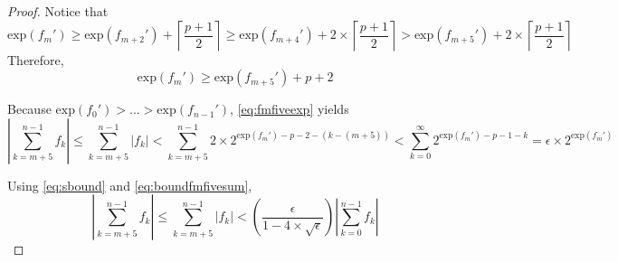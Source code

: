 \documentclass[12pt]{article}
\providecommand{\ceil}[1]{\left \lceil #1 \right \rceil }
\providecommand{\exp}{\ensuremath{\text{exp}}}
\theoremstyle{definition}
\numberwithin{equation}{section}
\numberwithin{figure}{section}
\begin{document}
\begin{proof}

      Notice that
        \begin{equation*}
          \exp(f_m') \geq \exp(f_{m + 2}') + \ceil{\frac{p+ 1}{2}} \geq \exp(f_{m + 4}') + 2 \times \ceil{\frac{p + 1}{2}} > \exp(f_{m + 5}')+ 2 \times \ceil{\frac{p+ 1}{2}}
        \end{equation*}
      Therefore,
        \begin{equation}
          \exp(f_m') \geq \exp(f_{m + 5}') + p + 2
          \label{eq:fmfiveexp}
        \end{equation}

      Because $\exp(f_0') > ... > \exp(f_{n - 1}')$, \eqref{eq:fmfiveexp} yields
        \begin{equation}
          |\sum\limits_{k = m + 5}^{n - 1} f_k| \leq \sum\limits_{k = m + 5}^{n - 1} |f_k| < \sum\limits_{k = m + 5}^{n - 1} 2 \times 2^{\exp(f_m') - p - 2 - (k - (m + 5))} < \sum\limits_{k = 0}^{\infty} 2^{\exp(f_m') - p - 1 - k} = \epsilon \times 2^{\exp(f_m')}
          \label{eq:boundfmfivesum}
        \end{equation}

      Using  \eqref{eq:sbound} and \eqref{eq:boundfmfivesum},
        \begin{equation}
          |\sum\limits_{k = m + 5}^{n - 1} f_k| \leq \sum\limits_{k = m + 5}^{n - 1} |f_k| < (\frac{\epsilon}{1 - 4 \times \sqrt\epsilon})|\sum\limits_{k = 0}^{n - 1} f_k|
          \label{eq:relsboundfmfivesum}
        \end{equation}


\end{proof}
\end{document}
